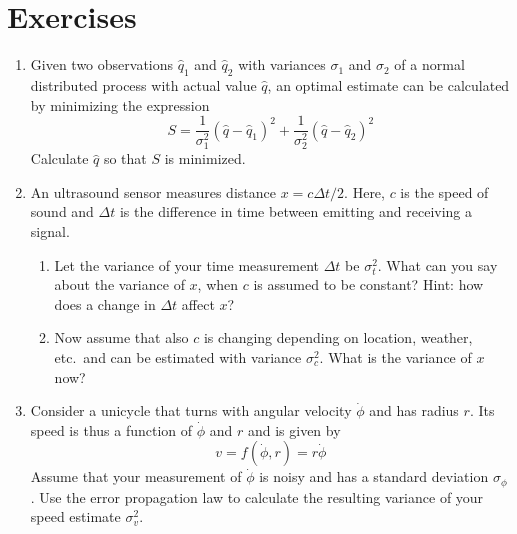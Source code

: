 \section*{Exercises}\small
\begin{enumerate}
\item Given two observations $\hat{q}_1$ and $\hat{q}_2$ with variances $\sigma_1$ and $\sigma_2$ of a normal distributed process with actual value $\hat{q}$, an optimal estimate can be calculated by minimizing the expression
\begin{equation}
\nonumber
S=\frac{1}{\sigma_1^2}(\hat{q}-\hat{q}_1)^2+\frac{1}{\sigma_2^2}(\hat{q}-\hat{q}_2)^2
\end{equation}
Calculate $\hat{q}$ so that $S$ is minimized.
\item An ultrasound sensor measures distance $x=c\Delta t/2$. Here, $c$ is the speed of sound and $\Delta t$ is the difference in time between emitting and receiving a signal.
\begin{enumerate}
\item Let the variance of your time measurement $\Delta t$ be $\sigma_t^2$. What can you say about the variance of $x$, when $c$ is assumed to be constant? Hint: how does a change in $\Delta t$ affect $x$?
\item Now assume that also $c$ is changing depending on location, weather, etc.\ and can be estimated with variance $\sigma_c^2$. What is the variance of $x$ now?
\end{enumerate}
\item Consider a unicycle that turns with angular velocity $\dot{\phi}$ and has radius $r$. Its speed is thus a function of $\dot{\phi}$ and $r$ and is given by
\begin{equation}
\nonumber
v=f(\dot{\phi},r)=r\dot{\phi}
\end{equation}
Assume that your measurement of $\dot{\phi}$ is noisy and has a standard deviation $\sigma_{\phi}$.  Use the error propagation law to calculate the resulting variance of your speed estimate $\sigma_v^2$.
\end{enumerate}
\normalsize
